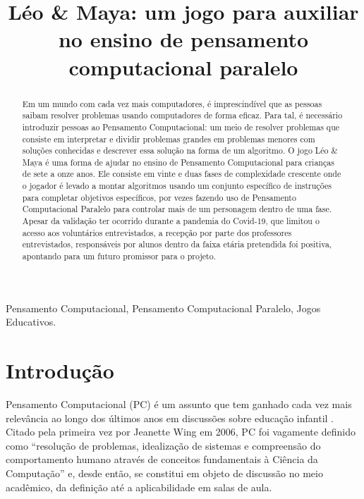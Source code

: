 \documentclass[conference]{IEEEtran}
\begin{document}
\title{Léo \& Maya: um jogo para auxiliar no ensino de pensamento computacional paralelo
}

%


\maketitle


\begin{abstract}
Em um mundo com cada vez mais computadores, é imprescindível que as pessoas saibam resolver problemas usando computadores de forma eficaz. Para tal, é necessário introduzir pessoas ao Pensamento Computacional: um meio de resolver problemas que consiste em interpretar e dividir problemas grandes em problemas menores com soluções conhecidas e descrever essa solução na forma de um algoritmo. O jogo Léo \& Maya é uma forma de ajudar no ensino de Pensamento Computacional para crianças de sete a onze anos. Ele consiste em vinte e duas fases de complexidade crescente onde o jogador é levado a montar algoritmos usando um conjunto específico de instruções para completar objetivos específicos, por vezes fazendo uso de Pensamento Computacional Paralelo para controlar mais de um personagem dentro de uma fase. Apesar da validação ter ocorrido durante a pandemia do Covid-19, que limitou o acesso aos voluntários entrevistados, a recepção por parte dos professores entrevistados, responsáveis por alunos dentro da faixa etária pretendida foi positiva, apontando para um futuro promissor para o projeto.
\end{abstract}

\renewcommand{\IEEEkeywordsname}{Palavras-Chave}
\begin{IEEEkeywords}
Pensamento Computacional, Pensamento Computacional Paralelo, Jogos Educativos.
\end{IEEEkeywords}

\section{Introdução}

Pensamento Computacional (PC) é um assunto que tem ganhado cada vez mais relevância ao longo dos últimos anos em discussões sobre educação infantil \cite{barr_bringing_2011}. Citado pela primeira vez por Jeanette Wing em 2006, PC foi vagamente definido como ``resolução de problemas, idealização de sistemas e compreensão do comportamento humano através de conceitos fundamentais à Ciência da Computação''\cite{wing_computational_2006} e, desde então, se constitui em objeto de discussão no meio acadêmico, da definição até a aplicabilidade em salas de aula.
\end{document}
